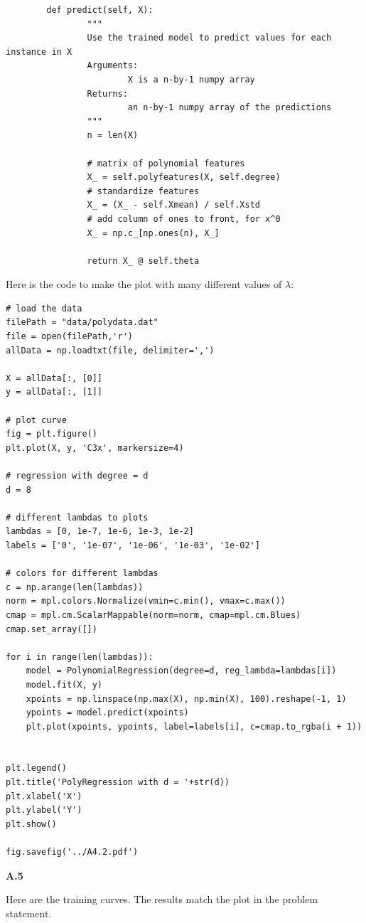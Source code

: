 \documentclass{article}
\begin{document}
\begin{verbatim}
        def predict(self, X):
                """
                Use the trained model to predict values for each instance in X
                Arguments:
                        X is a n-by-1 numpy array
                Returns:
                        an n-by-1 numpy array of the predictions
                """
                n = len(X)

                # matrix of polynomial features
                X_ = self.polyfeatures(X, self.degree)
                # standardize features
                X_ = (X_ - self.Xmean) / self.Xstd
                # add column of ones to front, for x^0
                X_ = np.c_[np.ones(n), X_]

                return X_ @ self.theta
\end{verbatim}

Here is the code to make the plot with many different values of $\lambda$:
\begin{verbatim}
# load the data
filePath = "data/polydata.dat"
file = open(filePath,'r')
allData = np.loadtxt(file, delimiter=',')

X = allData[:, [0]]
y = allData[:, [1]]

# plot curve
fig = plt.figure()
plt.plot(X, y, 'C3x', markersize=4)

# regression with degree = d
d = 8

# different lambdas to plots
lambdas = [0, 1e-7, 1e-6, 1e-3, 1e-2]
labels = ['0', '1e-07', '1e-06', '1e-03', '1e-02']

# colors for different lambdas
c = np.arange(len(lambdas))
norm = mpl.colors.Normalize(vmin=c.min(), vmax=c.max())
cmap = mpl.cm.ScalarMappable(norm=norm, cmap=mpl.cm.Blues)
cmap.set_array([])

for i in range(len(lambdas)):
    model = PolynomialRegression(degree=d, reg_lambda=lambdas[i])
    model.fit(X, y)
    xpoints = np.linspace(np.max(X), np.min(X), 100).reshape(-1, 1)
    ypoints = model.predict(xpoints)
    plt.plot(xpoints, ypoints, label=labels[i], c=cmap.to_rgba(i + 1))
    

plt.legend()
plt.title('PolyRegression with d = '+str(d))
plt.xlabel('X')
plt.ylabel('Y')
plt.show()

fig.savefig('../A4.2.pdf')
\end{verbatim}

\newpage

\textbf{A.5}

Here are the training curves.
The results match the plot in the problem statement.
\end{document}
